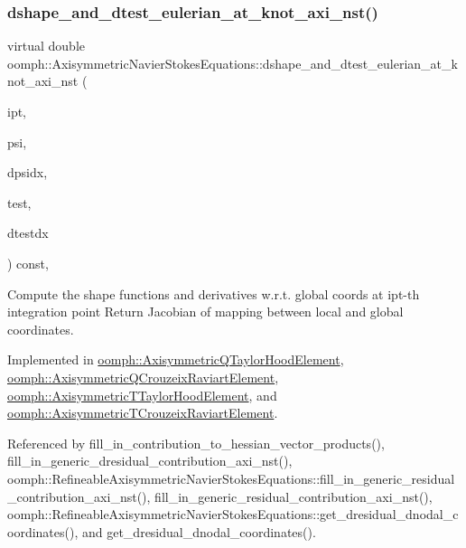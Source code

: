 \subsubsection{\texorpdfstring{dshape\+\_\+and\+\_\+dtest\+\_\+eulerian\+\_\+at\+\_\+knot\+\_\+axi\+\_\+nst()}{dshape\_and\_dtest\_eulerian\_at\_knot\_axi\_nst()}\hspace{0.1cm}{\footnotesize\ttfamily [1/2]}}
{\footnotesize\ttfamily virtual double oomph\+::\+Axisymmetric\+Navier\+Stokes\+Equations\+::dshape\+\_\+and\+\_\+dtest\+\_\+eulerian\+\_\+at\+\_\+knot\+\_\+axi\+\_\+nst (\begin{DoxyParamCaption}\item[{const unsigned \&}]{ipt,  }\item[{\hyperlink{classoomph_1_1Shape}{Shape} \&}]{psi,  }\item[{\hyperlink{classoomph_1_1DShape}{D\+Shape} \&}]{dpsidx,  }\item[{\hyperlink{classoomph_1_1Shape}{Shape} \&}]{test,  }\item[{\hyperlink{classoomph_1_1DShape}{D\+Shape} \&}]{dtestdx }\end{DoxyParamCaption}) const\hspace{0.3cm}{\ttfamily [protected]}, {}}



Compute the shape functions and derivatives w.\+r.\+t. global coords at ipt-\/th integration point Return Jacobian of mapping between local and global coordinates. 



Implemented in \hyperlink{classoomph_1_1AxisymmetricQTaylorHoodElement_abd3de2e051bca2f697560e907a53abde}{oomph\+::\+Axisymmetric\+Q\+Taylor\+Hood\+Element}, \hyperlink{classoomph_1_1AxisymmetricQCrouzeixRaviartElement_a84026f3c225ef35731a04cc5866c7d6b}{oomph\+::\+Axisymmetric\+Q\+Crouzeix\+Raviart\+Element}, \hyperlink{classoomph_1_1AxisymmetricTTaylorHoodElement_a1a696cb60dd4f10db4e6d5a8b4571a7d}{oomph\+::\+Axisymmetric\+T\+Taylor\+Hood\+Element}, and \hyperlink{classoomph_1_1AxisymmetricTCrouzeixRaviartElement_a7744f0666fd5005b65300843281efe81}{oomph\+::\+Axisymmetric\+T\+Crouzeix\+Raviart\+Element}.



Referenced by fill\+\_\+in\+\_\+contribution\+\_\+to\+\_\+hessian\+\_\+vector\+\_\+products(), fill\+\_\+in\+\_\+generic\+\_\+dresidual\+\_\+contribution\+\_\+axi\+\_\+nst(), oomph\+::\+Refineable\+Axisymmetric\+Navier\+Stokes\+Equations\+::fill\+\_\+in\+\_\+generic\+\_\+residual\+\_\+contribution\+\_\+axi\+\_\+nst(), fill\+\_\+in\+\_\+generic\+\_\+residual\+\_\+contribution\+\_\+axi\+\_\+nst(), oomph\+::\+Refineable\+Axisymmetric\+Navier\+Stokes\+Equations\+::get\+\_\+dresidual\+\_\+dnodal\+\_\+coordinates(), and get\+\_\+dresidual\+\_\+dnodal\+\_\+coordinates().


